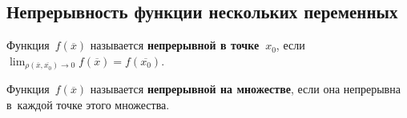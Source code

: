 \subsection{Непрерывность функции нескольких переменных}
 Функция~$f(\overline x)$ называется \textbf{непрерывной в точке~$x_0$}, если
$\displaystyle \lim_{\rho(\overline x, \overline{x_0}) \to 0} f(\overline x) = f(\overline{x_0})$.

Функция~$f(\overline x)$ называется \textbf{непрерывной на множестве}, если она непрерывна в~каждой точке этого множества.